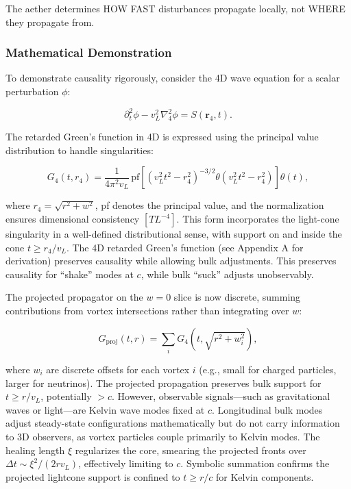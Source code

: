 \begin{tcolorbox}
The aether determines HOW FAST disturbances propagate locally, not WHERE they propagate from.
\end{tcolorbox}

\subsubsection{Mathematical Demonstration}

To demonstrate causality rigorously, consider the 4D wave equation for a scalar perturbation $\phi$:

\begin{equation}
\partial_t^2 \phi - v_L^2 \nabla_4^2 \phi = S(\mathbf{r}_4, t).
\end{equation}

The retarded Green's function in 4D is expressed using the principal value distribution to handle singularities:

\begin{equation}
G_4(t, r_4) = \frac{1}{4 \pi^2 v_L} \, \text{pf} \left[ (v_L^2 t^2 - r_4^2)^{-3/2} \theta(v_L^2 t^2 - r_4^2) \right] \theta(t),
\end{equation}

where $r_4 = \sqrt{r^2 + w^2}$, pf denotes the principal value, and the normalization ensures dimensional consistency $[T L^{-4}]$. This form incorporates the light-cone singularity in a well-defined distributional sense, with support on and inside the cone $t \geq r_4 / v_L$. The 4D retarded Green's function (see Appendix A for derivation) preserves causality while allowing bulk adjustments. This preserves causality for ``shake'' modes at $c$, while bulk ``suck'' adjusts unobservably.

The projected propagator on the $w=0$ slice is now discrete, summing contributions from vortex intersections rather than integrating over $w$:

\begin{equation}
G_{\text{proj}}(t, r) = \sum_i G_4(t, \sqrt{r^2 + w_i^2}),
\end{equation}

where $w_i$ are discrete offsets for each vortex $i$ (e.g., small for charged particles, larger for neutrinos). The projected propagation preserves bulk support for $t \geq r / v_L$, potentially $>c$. However, observable signals---such as gravitational waves or light---are Kelvin wave modes fixed at $c$. Longitudinal bulk modes adjust steady-state configurations mathematically but do not carry information to 3D observers, as vortex particles couple primarily to Kelvin modes. The healing length $\xi$ regularizes the core, smearing the projected fronts over $\Delta t \sim \xi^2 / (2 r v_L)$, effectively limiting to $c$. Symbolic summation confirms the projected lightcone support is confined to $t \geq r / c$ for Kelvin components.

